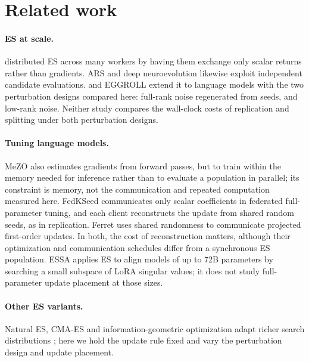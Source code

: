 \section{Related work}
\label{sec:related}

\paragraph{ES at scale.} \citet{salimans2017} distributed ES across many workers by having
them exchange only scalar returns rather than gradients. ARS \citep{mania2018} and deep
neuroevolution \citep{such2017,conti2017,chrabaszcz2018} likewise exploit independent
candidate evaluations.
\citet{qiu2025} and EGGROLL \citep{eggroll2025} extend it to language models with the two
perturbation designs compared here: full-rank noise regenerated from seeds, and low-rank
noise. Neither study compares the wall-clock costs of replication and splitting under
both perturbation designs.

\paragraph{Tuning language models.} MeZO \citep{malladi2023} also estimates gradients from
forward passes, but to train within the memory needed for inference rather than to evaluate a
population in parallel; its constraint is memory, not the communication and repeated
computation measured here. FedKSeed \citep{qin2024fedkseed} communicates only scalar
coefficients in federated full-parameter tuning, and each client reconstructs the update from
shared random seeds, as in replication. Ferret \citep{shu2025ferret} uses shared randomness to
communicate projected first-order updates. In both, the cost of reconstruction matters,
although their optimization and communication schedules differ from a synchronous ES
population. ESSA \citep{korotyshova2025essa} applies ES to align models of up to 72B
parameters by searching a small subspace of LoRA singular values; it does not study
full-parameter update placement at those sizes.

\paragraph{Other ES variants.} Natural ES, CMA-ES and information-geometric optimization adapt
richer search distributions \citep{wierstra2014,hansen2001,hansen2016,ollivier2017}; here we
hold the update rule fixed and vary the perturbation design and update placement.

